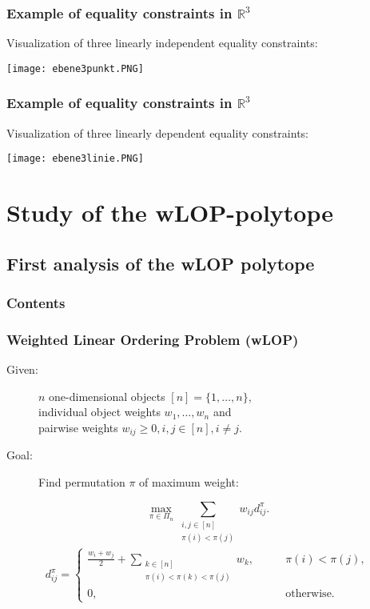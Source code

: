 \documentclass[xcolor=dvipsnames]{beamer}
\numberwithin{bsp}{section}
\numberwithin{figure}{section}
\begin{document}
\begin{frame}
	\frametitle{Example of equality constraints in $\mathbb{R}^{3}$}
	Visualization of three linearly independent equality constraints:
	\begin{center}
		\texttt{[image: ebene3punkt.PNG]}
	\end{center} 
\end{frame}

\begin{frame}
	\frametitle{Example of equality constraints in $\mathbb{R}^{3}$}
	Visualization of three linearly dependent equality constraints:
	\begin{center}
		\texttt{[image: ebene3linie.PNG]}
	\end{center} 
\end{frame}

\section{Study of the wLOP-polytope}

\subsection{First analysis of the wLOP polytope}

\begin{frame}[plain]
	\frametitle{Contents}
	\linespread{1.1}
	\tableofcontents[currentsubsection]
\end{frame}

\begin{frame}
	\frametitle{Weighted Linear Ordering Problem (wLOP)}
	
	\begin{description} \item [\textcolor{klu}{Given:}] $n$ one-dimensional objects $[n]=\{1, \ldots,n\}$,  \\ individual object weights $w_{1},\ldots,w_{n}$ and \\ pairwise weights
		$w_{ij}\geq 0, i,j\in [n], i\neq j$.\\\vspace*{0.5cm}
		
		\item[\textcolor{klu}{Goal:}] Find permutation $\pi$ of maximum weight:
	\end{description}
	\begin{equation*}
	\max_{\pi \in \Pi_n} \sum_{\substack{i,j \in [n]\\\pi(i)<\pi(j)}}w_{ij}d_{ij}^{\pi}.
	\end{equation*}
	\begin{align*}
	d_{ij}^{\pi} = \begin{cases} \frac{w_i+w_j}{2} + \sum\limits_{\substack{k \in [n]\\\pi(i) <
			\pi(k) < \pi(j)}}w_k,\qquad  & \pi(i) < \pi(j),\\
	0, & \text{otherwise}.
	\end{cases}
	\end{align*}
\end{frame}
\end{document}
